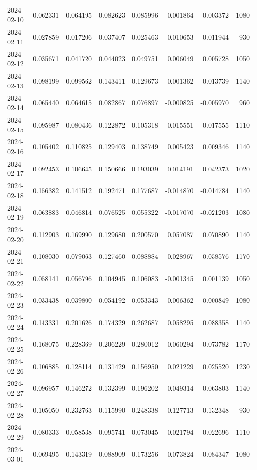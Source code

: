 \begin{tabular}{lrrrrrrr}
2024-02-10 & 0.062331 & 0.064195 & 0.082623 & 0.085996 & 0.001864 & 0.003372 & 1080 \\
2024-02-11 & 0.027859 & 0.017206 & 0.037407 & 0.025463 & -0.010653 & -0.011944 & 930 \\
2024-02-12 & 0.035671 & 0.041720 & 0.044023 & 0.049751 & 0.006049 & 0.005728 & 1050 \\
2024-02-13 & 0.098199 & 0.099562 & 0.143411 & 0.129673 & 0.001362 & -0.013739 & 1140 \\
2024-02-14 & 0.065440 & 0.064615 & 0.082867 & 0.076897 & -0.000825 & -0.005970 & 960 \\
2024-02-15 & 0.095987 & 0.080436 & 0.122872 & 0.105318 & -0.015551 & -0.017555 & 1110 \\
2024-02-16 & 0.105402 & 0.110825 & 0.129403 & 0.138749 & 0.005423 & 0.009346 & 1140 \\
2024-02-17 & 0.092453 & 0.106645 & 0.150666 & 0.193039 & 0.014191 & 0.042373 & 1020 \\
2024-02-18 & 0.156382 & 0.141512 & 0.192471 & 0.177687 & -0.014870 & -0.014784 & 1140 \\
2024-02-19 & 0.063883 & 0.046814 & 0.076525 & 0.055322 & -0.017070 & -0.021203 & 1080 \\
2024-02-20 & 0.112903 & 0.169990 & 0.129680 & 0.200570 & 0.057087 & 0.070890 & 1140 \\
2024-02-21 & 0.108030 & 0.079063 & 0.127460 & 0.088884 & -0.028967 & -0.038576 & 1170 \\
2024-02-22 & 0.058141 & 0.056796 & 0.104945 & 0.106083 & -0.001345 & 0.001139 & 1050 \\
2024-02-23 & 0.033438 & 0.039800 & 0.054192 & 0.053343 & 0.006362 & -0.000849 & 1080 \\
2024-02-24 & 0.143331 & 0.201626 & 0.174329 & 0.262687 & 0.058295 & 0.088358 & 1140 \\
2024-02-25 & 0.168075 & 0.228369 & 0.206229 & 0.280012 & 0.060294 & 0.073782 & 1170 \\
2024-02-26 & 0.106885 & 0.128114 & 0.131429 & 0.156950 & 0.021229 & 0.025520 & 1230 \\
2024-02-27 & 0.096957 & 0.146272 & 0.132399 & 0.196202 & 0.049314 & 0.063803 & 1140 \\
2024-02-28 & 0.105050 & 0.232763 & 0.115990 & 0.248338 & 0.127713 & 0.132348 & 930 \\
2024-02-29 & 0.080333 & 0.058538 & 0.095741 & 0.073045 & -0.021794 & -0.022696 & 1110 \\
2024-03-01 & 0.069495 & 0.143319 & 0.088909 & 0.173256 & 0.073824 & 0.084347 & 1080 \\

\end{tabular}
